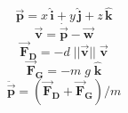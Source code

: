 \begin{equation}
  \bm{\vec{p}} = x  \,  \bm{\hat{i}} + y  \,  \bm{\hat{j}} + z  \,  \bm{\hat{k}}
\end{equation}
\vspace{-0.8em}
\begin{equation}
  \bm{\vec{v}} = \bm{\dot{\vec{p}}} - \bm{\vec{w}}
\end{equation}
\vspace{-0.5em}
\begin{equation}
  \bm{\vec{F}_D} = -d   \;  || \bm{\vec{v}} ||  \;  \bm{\vec{v}}
\end{equation}
\vspace{-0.5em}
\begin{equation}
  \bm{\vec{F}_G} = -m  \;  g  \;  \bm{\hat{k}}
\end{equation}
\vspace{-0.5em}
\begin{equation}
  \bm{\ddot{\vec{p}}} = ( \bm{\vec{F}_D} + \bm{\vec{F}_G} ) / m
\end{equation}




